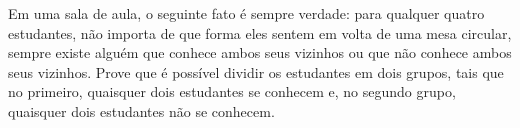 Em uma sala de aula, o seguinte fato é sempre verdade: para qualquer quatro estudantes, não importa de que forma eles sentem em volta de uma mesa circular, sempre existe alguém que conhece ambos seus vizinhos ou que não conhece ambos seus vizinhos. Prove que é possível dividir os estudantes em dois grupos, tais que no primeiro, quaisquer dois estudantes se conhecem e, no segundo grupo, quaisquer dois estudantes não se conhecem.

